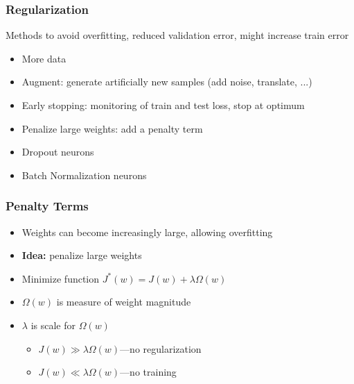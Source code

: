 \documentclass[aspectratio=169]{beamer}
\begin{document}
\begin{frame}
\frametitle{Regularization}

Methods to avoid overfitting, reduced validation error, might increase train error
\medskip
\begin{itemize}
    \item More data
    \item Augment: generate artificially new samples (add noise, translate, ...)
    \item Early stopping: monitoring of train and test loss, stop at optimum
    \item Penalize large weights: add a penalty term
    \item Dropout neurons
    \item Batch Normalization neurons
\end{itemize}
\end{frame}

\begin{frame}
    \frametitle{Penalty Terms}
    
    \begin{itemize}
        \item Weights can become increasingly large, allowing overfitting
        \item \textbf{Idea:} penalize large weights
        \item Minimize function $J^{*}(w)=J(w)+\lambda\Omega (w)$
        \item $\Omega (w)$ is measure of weight magnitude
        \item $\lambda$ is scale for $\Omega (w)$
        \begin{itemize}
            \item $J(w)\gg\lambda\Omega (w)$---no regularization
            \item $J(w)\ll\lambda\Omega (w)$---no training
        \end{itemize}
    \end{itemize}
\end{frame}
\end{document}
